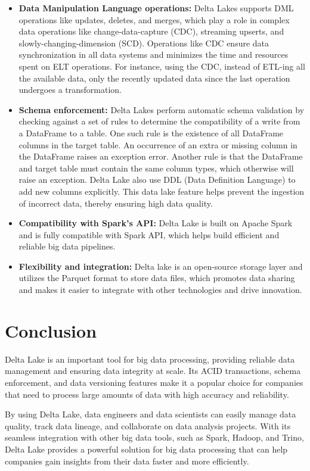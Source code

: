 \begin{itemize}
    \item[\textbullet] \textbf{Data Manipulation Language operations:} Delta Lakes supports DML operations like updates, deletes, and merges, which play a role in complex data operations like change-data-capture (CDC), streaming upserts, and slowly-changing-dimension (SCD). Operations like CDC ensure data synchronization in all data systems and minimizes the time and resources spent on ELT operations. For instance, using the CDC, instead of ETL-ing all the available data, only the recently updated data since the last operation undergoes a transformation.
    \item[\textbullet] \textbf{Schema enforcement:} Delta Lakes perform automatic schema validation by checking against a set of rules to determine the compatibility of a write from a DataFrame to a table. One such rule is the existence of all DataFrame columns in the target table. An occurrence of an extra or missing column in the DataFrame raises an exception error. Another rule is that the DataFrame and target table must contain the same column types, which otherwise will raise an exception. Delta Lake also use DDL (Data Definition Language) to add new columns explicitly. This data lake feature helps prevent the ingestion of incorrect data, thereby ensuring high data quality.
    \item[\textbullet] \textbf{Compatibility with Spark's API:} Delta Lake is built on Apache Spark and is fully compatible with Spark API, which helps build efficient and reliable big data pipelines.
    \item[\textbullet] \textbf{Flexibility and integration:} Delta lake is an open-source storage layer and utilizes the Parquet format to store data files, which promotes data sharing and makes it easier to integrate with other technologies and drive innovation.
\end{itemize}

\section*{Conclusion}

Delta Lake is an important tool for big data processing, providing reliable data management and ensuring data integrity at scale. Its ACID transactions, schema enforcement, and data versioning features make it a popular choice for companies that need to process large amounts of data with high accuracy and reliability.

By using Delta Lake, data engineers and data scientists can easily manage data quality, track data lineage, and collaborate on data analysis projects. With its seamless integration with other big data tools, such as Spark, Hadoop, and Trino, Delta Lake provides a powerful solution for big data processing that can help companies gain insights from their data faster and more efficiently.
